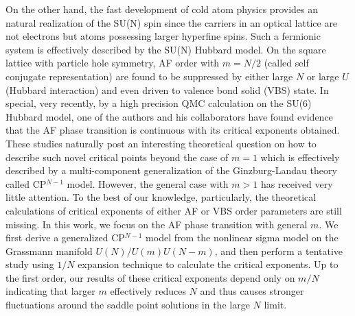 \documentclass[aps,twocolumn,superscriptaddress]{revtex4-1}
\begin{document}
On the other hand, the fast development of cold atom physics provides an natural realization of the SU(N)
spin since the carriers in an optical lattice are not electrons but atoms possessing larger hyperfine spins.
\cite{wu2003,wu2005,*wu2006,honerkamp2004,taie2010,desalvo2010,krauser2012,zhang2014,hart2015} 
Such a fermionic system is effectively described by the SU(N) Hubbard model.
\cite{honerkamp2004,assaad2005,cai2013a,cai2013,wang2014,zhou2014,*zhou2016,*zhou2017} On the square lattice with
particle hole symmetry, AF order with $m=N/2$ (called self conjugate representation) are found to be suppressed by
either large $N$ or large $U$ (Hubbard interaction) and even driven to valence bond solid (VBS) state.
\cite{cai2013,wang2014} In special, very recently, by a high precision QMC calculation on the SU(6) Hubbard model, one of the authors
and his collaborators have found evidence that the AF phase transition is continuous with its critical exponents obtained.  
\cite{wang2014,wang2018}
These studies naturally post an interesting theoretical question on how to describe such novel critical points beyond the case of $m=1$ which is effectively described by a multi-component generalization of the Ginzburg-Landau theory called CP$^{N-1}$ model.
\cite{halperin1974,hikami1979,read1989,read1989a,chubukov1994,starykh1994,irkhin1996,kaul2008,block2013,demidio2017} However, the
general case with $m>1$ has received very little attention. \cite{macfarlane1979,hikami1980,duerksen1981,maharana1983}
To the best of our knowledge, particularly, the theoretical calculations of critical exponents of either AF or
VBS order parameters are still missing. In this work, we focus on the AF phase transition with general $m$. We first derive a generalized
CP$^{N-1}$ model from the nonlinear sigma model on the Grassmann manifold $U(N)/U(m)U(N-m)$, and then perform a tentative study using $1/N$ expansion
technique to calculate the critical exponents. Up to the first order, our results of these critical exponents
depend only on $m/N$ indicating that larger $m$ effectively reduces $N$ and thus causes stronger fluctuations around the saddle point solutions
in the large $N$ limit. 
\end{document}
